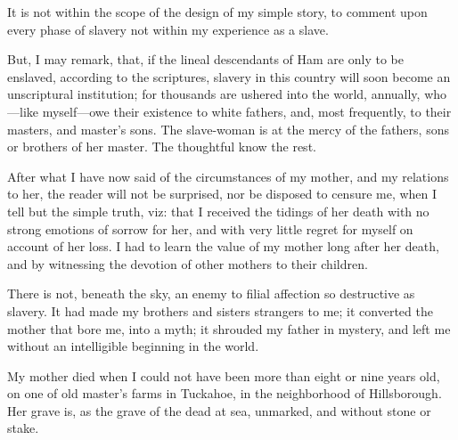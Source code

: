 It is not within the scope of the design of my simple story, to comment
upon every phase of slavery not within my experience as a slave.

But, I may remark, that, if the lineal descendants of Ham are only to be
enslaved, according to the {}scriptures, slavery in this country will
soon become an unscriptural institution; for thousands are ushered into
the world, annually, who---like myself---owe their existence to white
fathers, and, most frequently, to their masters, and master's sons. The
slave-woman is at the mercy of the fathers, sons or brothers of her
master. The thoughtful know the rest.

After what I have now said of the circumstances of my mother, and my
relations to her, the reader will not be surprised, nor be disposed to
censure me, when I tell but the simple truth, viz: that I received the
tidings of her death with no strong emotions of sorrow for her, and with
very little regret for myself on account of her loss. I had to learn the
value of my mother long after her death, and by witnessing the devotion
of other mothers to their children.

There is not, beneath the sky, an enemy to filial affection so
destructive as slavery. It had made my brothers and sisters strangers to
me; it converted the mother that bore me, into a myth; it shrouded my
father in mystery, and left me without an intelligible beginning in the
world.

My mother died when I could not have been more than eight or nine years
old, on one of old master's farms in Tuckahoe, in the neighborhood of
Hillsborough. Her grave is, as the grave of the dead at sea, unmarked,
and without stone or stake.
